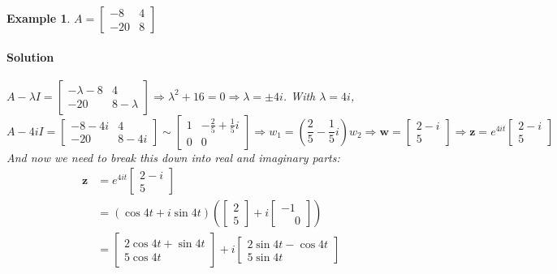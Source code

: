 \documentclass[letterpaper, 11pt, openany]{book}
\theoremstyle{mytheoremstyle}
\theoremstyle{myexamplestyle}
\newtheorem{example}{Example}[section]
\newenvironment{solution}{\paragraph{\sffamily \smaller \fontseries{b}\selectfont Solution}}{\hfill\faSquare}
\begin{document}
\begin{example}\label{e:de-comp-conj-zero-real}
    \(A = \begin{bmatrix}
        -8 & 4 \\
        -20 & 8 
    \end{bmatrix}\)
    \begin{solution}
        \(A - \lambda I = \begin{bmatrix}
            -\lambda -8 & 4 \\
        -20 & 8-\lambda
        \end{bmatrix} \Rightarrow \lambda^2 + 16 = 0 \Rightarrow \lambda = \pm 4i \). With \(\lambda = 4i\),
        \[A - 4iI = \begin{bmatrix}-8-4 i & 4 \\-20 & 8-4 i\end{bmatrix} \sim \begin{bmatrix}1 & -\frac{2}{5}+\frac{1}{5}i \\0 & 0 \end{bmatrix} \Rightarrow w_{1} = \left(\frac{2}{5}-\frac{1}{5}i\right)w_{2}\Rightarrow \mathbf{w} = \begin{bmatrix}2-i \\ 5\end{bmatrix} \Rightarrow \mathbf{z} = e^{4it} \begin{bmatrix}2-i \\ 5\end{bmatrix}\]
        And now we need to break this down into real and imaginary parts:
        \begin{align*}
            \mathbf{z}  &= e^{4it} \begin{bmatrix}2-i \\ 5\end{bmatrix}\\
                        &= \left(\cos 4t + i \sin 4t\right)\left(\begin{bmatrix}2 \\ 5\end{bmatrix}+ i \begin{bmatrix}-1 \\  \phantom{-}0\end{bmatrix}\right)\\
                        &=\begin{bmatrix}2 \cos 4t + \sin 4t \\ 5 \cos 4t\end{bmatrix} + i \begin{bmatrix}2\sin 4t - \cos 4t \\ 5 \sin 4t\end{bmatrix}\\

\end{align*}
\end{solution}
\end{example}
\end{document}
